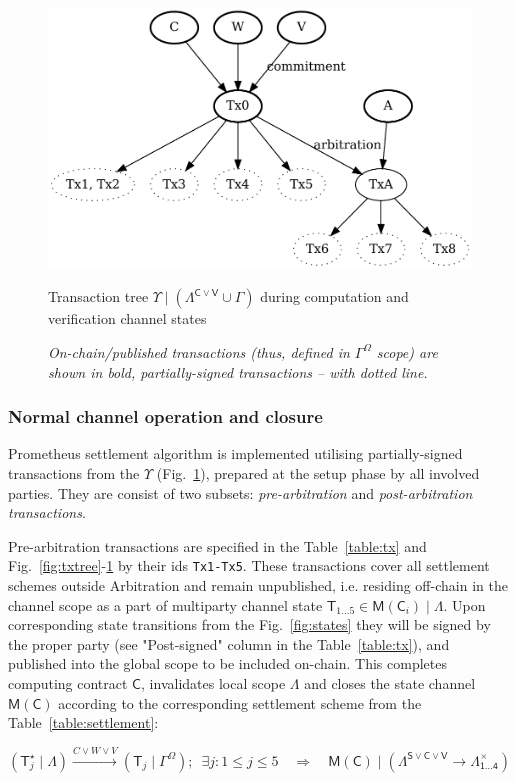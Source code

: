 \documentclass[a4paper]{article}
\begin{document}
\begin{figure}[h!]
    \centering
    \includegraphics[width=0.75\columnwidth]{assets/upsilon.pdf}
    \caption{Transaction tree $\Upsilon\mid(\Lambda^{\mathsf{C}\vee\mathsf{V}} \cup \Gamma)$ during computation and verification channel states}
    \caption*{\textit{On-chain/published transactions (thus, defined in $\Gamma^\Omega$ scope) are shown in bold, partially-signed transactions -- with dotted line.}}
    \label{fig:upsilon}
\end{figure}

\subsubsection{Normal channel operation and closure}
Prometheus settlement algorithm is implemented utilising partially-signed transactions from the $\Upsilon$ (Fig.~\ref{fig:upsilon}), prepared at the setup phase by all involved parties. They are consist of two subsets: \textit{pre-arbitration} and \textit{post-arbitration transactions}. 

Pre-arbitration transactions are specified in the Table~\ref{table:tx} and Fig.~\ref{fig:txtree}-\ref{fig:upsilon} by their ids \texttt{Tx1-Tx5}. These transactions cover all settlement schemes outside Arbitration and remain unpublished, i.e. residing off-chain in the channel scope as a part of multiparty channel state $\mathsf{T}_{1\dots5} \in \mathsf{M}(\mathsf{C}_i) \mid \Lambda$. Upon corresponding state transitions from the Fig.~\ref{fig:states} they will be signed by the proper party (see "Post-signed" column in the Table~\ref{table:tx}), and published into the global scope to be included on-chain. This completes computing contract $\mathsf{C}$, invalidates local scope $\Lambda$ and closes the state channel $\mathsf{M}(\mathsf{C})$ according to the corresponding settlement scheme from the Table~\ref{table:settlement}:

$(\mathsf{T}^\star_j\mid\Lambda) \xrightarrow{C \vee W \vee V} (\mathsf{T}_j \mid \Gamma^\Omega);\enspace \exists j: 1 \le j \le 5\quad \Longrightarrow \quad \mathsf{M}(\mathsf{C}) \mid (\Lambda^{\mathsf{S}\vee\mathsf{C}\vee\mathsf{V}} \rightarrow \Lambda^\times_{\mathsf{1\dots4}})$
\end{document}
